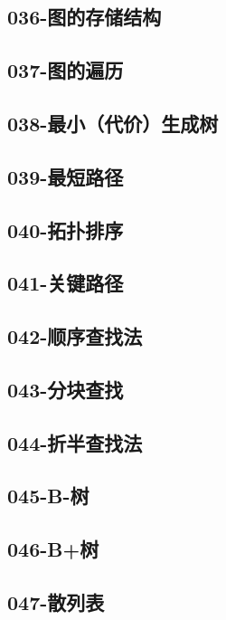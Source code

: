 \subsection{036-图的存储结构}

\subsection{037-图的遍历}

\subsection{038-最小（代价）生成树}

\subsection{039-最短路径}

\subsection{040-拓扑排序}

\subsection{041-关键路径}

\subsection{042-顺序查找法}

\subsection{043-分块查找}

\subsection{044-折半查找法}

\subsection{045-B-树}

\subsection{046-B+树}

\subsection{047-散列表}

